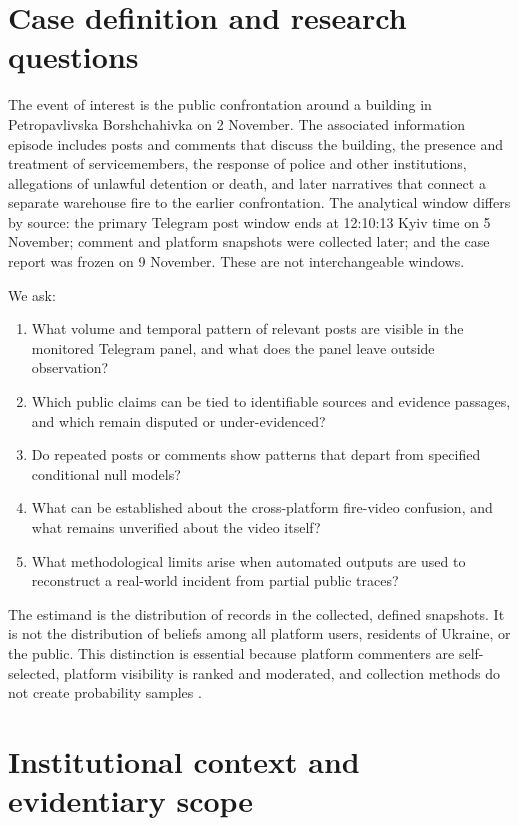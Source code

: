 \section{Case definition and research questions}

The event of interest is the public confrontation around a building in Petropavlivska Borshchahivka on 2 November. The associated information episode includes posts and comments that discuss the building, the presence and treatment of servicemembers, the response of police and other institutions, allegations of unlawful detention or death, and later narratives that connect a separate warehouse fire to the earlier confrontation. The analytical window differs by source: the primary Telegram post window ends at 12:10:13 Kyiv time on 5 November; comment and platform snapshots were collected later; and the case report was frozen on 9 November. These are not interchangeable windows.

We ask:
\begin{enumerate}
\item What volume and temporal pattern of relevant posts are visible in the monitored Telegram panel, and what does the panel leave outside observation?
\item Which public claims can be tied to identifiable sources and evidence passages, and which remain disputed or under-evidenced?
\item Do repeated posts or comments show patterns that depart from specified conditional null models?
\item What can be established about the cross-platform fire-video confusion, and what remains unverified about the video itself?
\item What methodological limits arise when automated outputs are used to reconstruct a real-world incident from partial public traces?
\end{enumerate}

The estimand is the distribution of records in the collected, defined snapshots. It is not the distribution of beliefs among all platform users, residents of Ukraine, or the public. This distinction is essential because platform commenters are self-selected, platform visibility is ranked and moderated, and collection methods do not create probability samples \citep{olteanu2019social,vicente2023sampling,pfeffer2023sample}.

\section{Institutional context and evidentiary scope}

